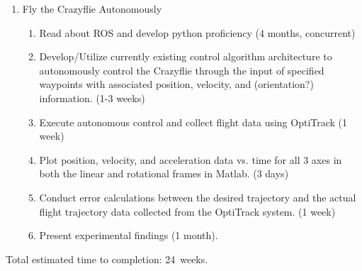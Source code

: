\documentclass[onecolumn,10pt]{IEEEtran}
\newcommand{\myroot}{../}
\newcommand{\MATLAB}{Matlab}
\begin{document}
\begin{enumerate}
\begin{enumerate}
\item Fly the Crazyflie Autonomously
\begin{enumerate}
\item Read about ROS and develop python proficiency (4 months, concurrent)
\item Develop/Utilize currently existing control algorithm architecture to autonomously control the Crazyflie through the input of specified waypoints with associated position, velocity, and (orientation?) information. (1-3 weeks)
\item Execute autonomous control and collect flight data using OptiTrack (1 week)
\item Plot position, velocity, and acceleration data vs. time for all 3 axes in both the linear and rotational frames in \MATLAB. (3 days)
\item Conduct error calculations between the desired trajectory and the actual flight trajectory data collected from the OptiTrack system. (1 week)
\item Present experimental findings (1 month).
\end{enumerate}

\end{enumerate}
\end{enumerate}

Total estimated time to completion: \SI{24}{weeks}.


  


%
\end{document}
